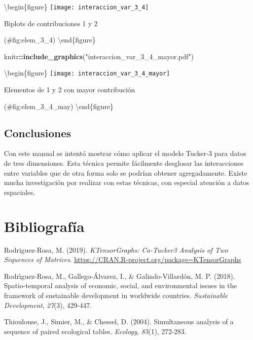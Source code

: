 \documentclass[
  spanish,
]{article}
\newenvironment{Shaded}{\begin{snugshade}}{\end{snugshade}}
\newcommand{\KeywordTok}[1]{\textcolor[rgb]{0.13,0.29,0.53}{\textbf{#1}}}
\newcommand{\NormalTok}[1]{#1}
\newcommand{\OperatorTok}[1]{\textcolor[rgb]{0.81,0.36,0.00}{\textbf{#1}}}
\newcommand{\StringTok}[1]{\textcolor[rgb]{0.31,0.60,0.02}{#1}}
\newlength{\cslhangindent}
\newenvironment{cslreferences}%
  {\setlength{\parindent}{0pt}%
  \everypar{\setlength{\hangindent}{\cslhangindent}}\ignorespaces}%
  {\par}
\begin{document}
\textbackslash begin\{figure\}
\texttt{[image: interaccion\_var\_3\_4]}

\caption{Biplots de contribuciones 1 y 2}

(\#fig:elem\_3\_4)
\textbackslash end\{figure\}

\begin{Shaded}
\begin{Highlighting}[]
\NormalTok{knitr}\OperatorTok{::}\KeywordTok{include\_graphics}\NormalTok{(}\StringTok{"interaccion\_var\_3\_4\_mayor.pdf"}\NormalTok{)}
\end{Highlighting}
\end{Shaded}

\textbackslash begin\{figure\}
\texttt{[image: interaccion\_var\_3\_4\_mayor]}

\caption{Elementos de 1 y 2 con mayor contribución}

(\#fig:elem\_3\_4\_may)
\textbackslash end\{figure\}

\hypertarget{conclusiones}{%
\subsection{Conclusiones}\label{conclusiones}}

Con este manual se intentó mostrar cómo aplicar el modelo Tucker-3 para datos de tres dimensiones. Esta técnica permite fácilmente desglosar las interacciones entre variables que de otra forma solo se podrían obtener agregadamente. Existe mucha investigación por realizar con estas técnicas, con especial atención a datos espaciales.

\hypertarget{bibliografuxeda}{%
\section*{Bibliografía}\label{bibliografuxeda}}

\hypertarget{refs}{}
\begin{cslreferences}
\leavevmode\hypertarget{ref-Rodriguez2019}{}%
Rodriguez-Rosa, M. (2019). \emph{KTensorGraphs: Co-Tucker3 Analysis of Two Sequences of Matrices}. \url{https://CRAN.R-project.org/package=KTensorGraphs}

\leavevmode\hypertarget{ref-rodriguez2018}{}%
Rodrı́guez-Rosa, M., Gallego-Álvarez, I., \& Galindo-Villardón, M. P. (2018). Spatio-temporal analysis of economic, social, and environmental issues in the framework of sustainable development in worldwide countries. \emph{Sustainable Development}, \emph{27}(3), 429-447.

\leavevmode\hypertarget{ref-thioulouse2004}{}%
Thioulouse, J., Simier, M., \& Chessel, D. (2004). Simultaneous analysis of a sequence of paired ecological tables. \emph{Ecology}, \emph{85}(1), 272-283.
\end{cslreferences}
\end{document}
